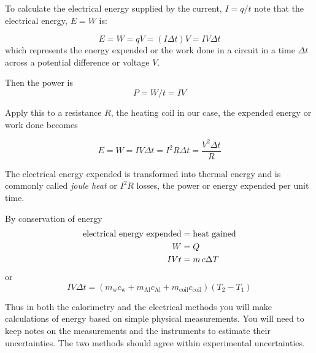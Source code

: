 To calculate the electrical energy supplied by the current, $I=q/t$ note that the electrical energy, $E = W$ is: %

\begin{equation}
	\label{e:iheat} E = W = qV = (I\Delta t)V = IV\Delta t
\end{equation}
which represents the energy expended or the work done in a circuit in a time  $\Delta t$ across a potential difference or voltage $V$.	


Then the power is 
\begin{equation}\label{e:power} P = W/t = IV \end{equation}

Apply this to a resistance $R$, the heating coil in our case, the expended energy or work done becomes

\begin{equation}\label{e:eWork} 
E = W = IV\Delta t = I^2R\Delta t = \frac{V^2\Delta t}{R} 
\end{equation}

The electrical energy expended is transformed into thermal energy and is commonly called \emph{joule heat} or $I^2 R$ losses, the power or energy expended per unit time.

By conservation of energy
\begin{align} 
\text{electrical energy expended} & = \text{heat gained} \notag \\
W & = Q \notag \\
IVt & = m\,c\Delta T \notag
\end{align}
or
\begin{equation}
IV\Delta t = \left(m_{\textrm{w}}c_{\textrm{w}} + m_{\textrm{Al}}c_{\textrm{Al}} + m_{\textrm{coil}}c_{\textrm{coil}}\right)\left(T_2 - T_1\right)
\end{equation}

Thus in both the calorimetry and the electrical methods you will make calculations of energy based on simple physical measurements.  You will need to keep notes on the measurements and the instruments to estimate their uncertainties.  The two methods should agree within experimental uncertainties.

